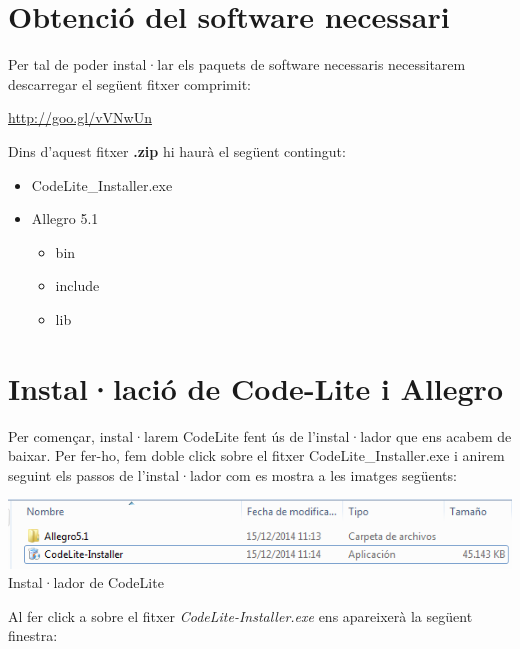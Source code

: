\documentclass[11pt]{article}
\begin{document}
\section{Obtenció del software necessari}
Per tal de poder instal·lar els paquets de software necessaris necessitarem descarregar el següent fitxer comprimit:
\begin{center}
	\url{http://goo.gl/vVNwUn}
\end{center}

Dins d'aquest fitxer \textbf{.zip} hi haurà el següent contingut:

\begin{itemize}
	\item CodeLite\_Installer.exe
	\item Allegro 5.1
		\begin{itemize}
			\item bin
			\item include
			\item lib
		\end{itemize}
\end{itemize}

\section{Instal·lació de Code-Lite i Allegro}
\noindent Per començar, instal·larem CodeLite fent ús de l'instal·lador que ens acabem de baixar. Per fer-ho, fem  doble click sobre el fitxer CodeLite\_Installer.exe i anirem seguint els passos de l'instal·lador com es mostra a les imatges següents:

\begin{center}

\includegraphics[scale=0.6]{img/Installer_1.png}\\
\small{Instal·lador de CodeLite}\\
\end{center}

\newpage
\noindent Al fer click a sobre el fitxer \textit{CodeLite-Installer.exe} ens apareixerà la següent finestra:
\end{document}

